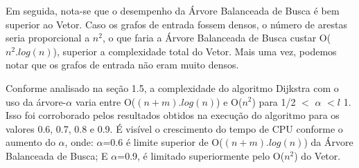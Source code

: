 \documentclass[
	12pt,				%
	oneside,			%
	a4paper,			%
	english,			%
	french,				%
	spanish,			%
	brazil,				%
	]{abntex2}
\begin{document}
Em seguida, nota-se que o desempenho da Árvore Balanceada de Busca é bem superior ao Vetor. Caso os grafos de entrada fossem densos, o número de arestas seria proporcional a $n^2$, o que faria a Árvore Balanceada de Busca custar O($n^2.log(n)$), superior a complexidade total do Vetor. Mais uma vez, podemos notar que os grafos de entrada não eram muito densos.


Conforme analisado na seção 1.5, a complexidade do algoritmo Dijkstra com o uso da árvore-$\alpha$ varia entre O($(n+m).log(n)$) e O($n^2$) para 1/2 $<$ $\alpha$ $<l$ 1. Isso foi corroborado pelos resultados obtidos na execução do algoritmo para os valores 0.6, 0.7, 0.8 e 0.9. É visível o crescimento do tempo de CPU conforme o aumento do $\alpha$, onde: $\alpha$=0.6 é limite superior de O($(n+m).log(n)$) da Árvore Balanceada de Busca; E $\alpha$=0.9, é limitado superiormente pelo O($n^2$) do Vetor.








\end{document}

